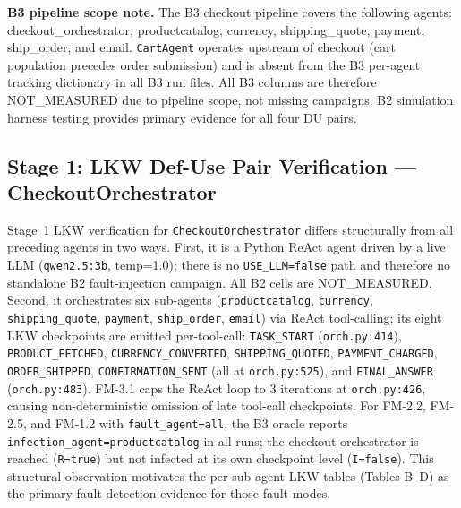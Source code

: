 \documentclass[sigconf,review,anonymous,balance=false]{acmart}
\begin{document}
\begin{table}[t]
\smallskip\par\noindent
\textbf{B3 pipeline scope note.}
The B3 checkout pipeline covers the following agents:
checkout\_orchestrator, productcatalog, currency, shipping\_quote, payment,
ship\_order, and email.
\texttt{CartAgent} operates upstream of checkout (cart population precedes
order submission) and is absent from the B3 per-agent tracking dictionary
in all B3 run files.
All B3 columns are therefore NOT\_MEASURED due to pipeline scope, not missing
campaigns.
B2 simulation harness testing provides primary evidence for all four DU pairs.
\end{table}

\subsection{Stage 1: LKW Def-Use Pair Verification --- CheckoutOrchestrator}
\label{sec:lkw-stage1-checkout}

Stage~1 LKW verification for \texttt{CheckoutOrchestrator} differs
structurally from all preceding agents in two ways.
First, it is a Python ReAct agent driven by a live LLM (\texttt{qwen2.5:3b},
temp=1.0); there is no \texttt{USE\_LLM=false} path and therefore no
standalone B2 fault-injection campaign.
All B2 cells are NOT\_MEASURED.
Second, it orchestrates six sub-agents (\texttt{productcatalog},
\texttt{currency}, \texttt{shipping\_quote}, \texttt{payment},
\texttt{ship\_order}, \texttt{email}) via ReAct tool-calling; its eight LKW
checkpoints are emitted per-tool-call: \texttt{TASK\_START}
(\texttt{orch.py:414}), \texttt{PRODUCT\_FETCHED}, \texttt{CURRENCY\_CONVERTED},
\texttt{SHIPPING\_QUOTED}, \texttt{PAYMENT\_CHARGED}, \texttt{ORDER\_SHIPPED},
\texttt{CONFIRMATION\_SENT} (all at \texttt{orch.py:525}), and
\texttt{FINAL\_ANSWER} (\texttt{orch.py:483}).
FM-3.1 caps the ReAct loop to 3 iterations at \texttt{orch.py:426},
causing non-deterministic omission of late tool-call checkpoints.
For FM-2.2, FM-2.5, and FM-1.2 with \texttt{fault\_agent=all}, the
B3 oracle reports \texttt{infection\_agent=productcatalog} in all runs;
the checkout orchestrator is reached (\texttt{R=true}) but not infected at
its own checkpoint level (\texttt{I=false}).
This structural observation motivates the per-sub-agent LKW tables
(Tables B--D) as the primary fault-detection evidence for those fault modes.
\end{document}
